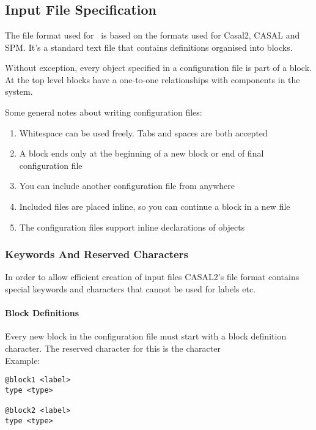 
\section{\label{sec:examples}}

\subsection{Input File Specification}
The file format used for \IBM\ is based on the formats used for Casal2, CASAL and SPM. It's a standard text file that contains definitions organised into blocks.

Without exception, every object specified in a configuration file is part of a block. At the top level blocks have a one-to-one relationships with components in the system.


Some general notes about writing configuration files:
\begin{enumerate}
	\item Whitespace can be used freely. Tabs and spaces are both accepted
	\item A block ends only at the beginning of a new block or end of final configuration file
	\item You can include another configuration file from anywhere
	\item Included files are placed inline, so you can continue a block in a new file
	\item The configuration files support inline declarations of objects
\end{enumerate}

\subsubsection{Keywords And Reserved Characters}
In order to allow efficient creation of input files CASAL2's file format contains special keywords and characters that cannot be used for labels etc.

\paragraph*{\command Block Definitions}
Every new block in the configuration file must start with a block definition character. The reserved character for this is the \command character\\
Example:
{\small{\begin{verbatim}
@block1 <label>
type <type>

@block2 <label>
type <type>
\end{verbatim}}}

